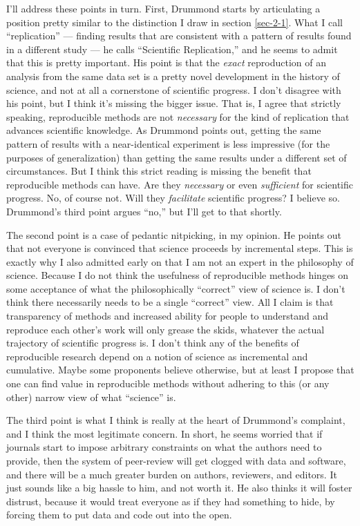 \documentclass{book}
\begin{document}
I'll address these points in turn. First, Drummond starts by articulating a position pretty similar to the distinction I draw in section \ref{sec-2-1}. What I call ``replication'' --- finding results that are consistent with a pattern of results found in a different study --- he calls ``Scientific Replication,'' and he seems to admit that this is pretty important. His point is that the \emph{exact} reproduction of an analysis from the same data set is a pretty novel development in the history of science, and not at all a cornerstone of scientific progress. I don't disagree with his point, but I think it's missing the bigger issue. That is, I agree that strictly speaking, reproducible methods are not \emph{necessary} for the kind of replication that advances scientific knowledge. As Drummond points out, getting the same pattern of results with a near-identical experiment is less impressive (for the purposes of generalization) than getting the same results under a different set of circumstances.  But I think this strict reading is missing the benefit that reproducible methods can have. Are they \emph{necessary} or even \emph{sufficient} for scientific progress. No, of course not. Will they \emph{facilitate} scientific progress?  I believe so. Drummond's third point argues ``no,'' but I'll get to that shortly.

The second point is a case of pedantic nitpicking, in my opinion. He points out that not everyone is convinced that science proceeds by incremental steps. This is exactly why I also admitted early on that I am not an expert in the philosophy of science. Because I do not think the usefulness of reproducible methods hinges on some acceptance of what the philosophically ``correct'' view of science is. I don't think there necessarily needs to be a single ``correct'' view. All I claim is that transparency of methods and increased ability for people to understand and reproduce each other's work will only grease the skids, whatever the actual trajectory of scientific progress is. I don't think any of the benefits of reproducible research depend on a notion of science as incremental and cumulative.  Maybe some proponents believe otherwise, but at least I propose that one can find value in reproducible methods without adhering to this (or any other) narrow view of what ``science'' is.

The third point is what I think is really at the heart of Drummond's complaint, and I think the most legitimate concern. In short, he seems worried that if journals start to impose arbitrary constraints on what the authors need to provide, then the system of peer-review will get clogged with data and software, and there will be a much greater burden on authors, reviewers, and editors. It just sounds like a big hassle to him, and not worth it. He also thinks it will foster distrust, because it would treat everyone as if they had something to hide, by forcing them to put data and code out into the open. 
\end{document}
